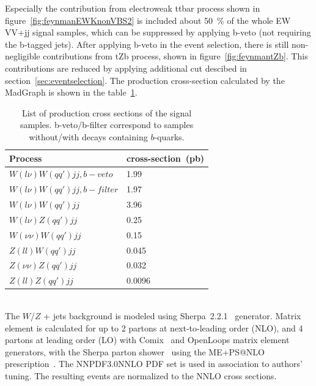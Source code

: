 Especially the contribution from electroweak ttbar process shown in figure~\ref{fig:feynmanEWKnonVBS2} is included about 50~\% of the whole EW VV+jj signal samples, which can be suppressed by applying b-veto (not requiring the b-tagged jets). After applying b-veto in the event selection, there is still non-negligible contributions from tZb process, shown in figure~\ref{fig:feynmantZb}. This contributions are reduced by applying additional cut descibed in section~\ref{sec:eventselection}.
The production cross-section calculated by the MadGraph is shown in the table~\ref{tab:VBS_sig_samples}. \\ 
\begin{table}[!htbp]
\begin{center}
\small
\begin{tabular}{|l|l|}
\hline
Process & cross-section~(pb) \\
\hline
$W(l\nu)W(qq\prime)jj,b-veto$    &  1.99    \\
$W(l\nu)W(qq\prime)jj,b-filter$  &  1.97   \\
$W(l\nu)W(qq\prime)jj$            &  3.96   \\
$W(l\nu)Z(qq\prime)jj$            &  0.25   \\
$W(\nu\nu)W(qq\prime)jj$          &  0.15   \\
$Z(ll)W(qq\prime)jj$              &  0.045  \\
$Z(\nu\nu)Z(qq\prime)jj$          &  0.032  \\
$Z(ll)Z(qq\prime)jj$              &  0.0096 \\
\hline
\end{tabular}
\caption{List of production cross sections of the signal samples. b-veto/b-filter correspond to samples without/with decays containing $b$-quarks.}
\label{tab:VBS_sig_samples}
\end{center}
\end{table}

\noindent\textbf{} \\ 
The $W$/$Z$ + jets background is modeled using Sherpa~2.2.1~\cite{Gleisberg:2008ta} generator. 
Matrix element is calculated for up to 2 partons at next-to-leading order (NLO), and 4 partons at leading order (LO) with Comix~\cite{Gleisberg:2008fv} and OpenLoops\cite{Cascioli:2011va} matrix element generators, with the Sherpa parton shower~\cite{Schumann:2007mg} using the ME+PS@NLO prescription~\cite{Hoeche:2012yf}.
The NNPDF3.0NNLO PDF set is used in association to authors' tuning. The resulting events are normalized to the NNLO cross sections.

